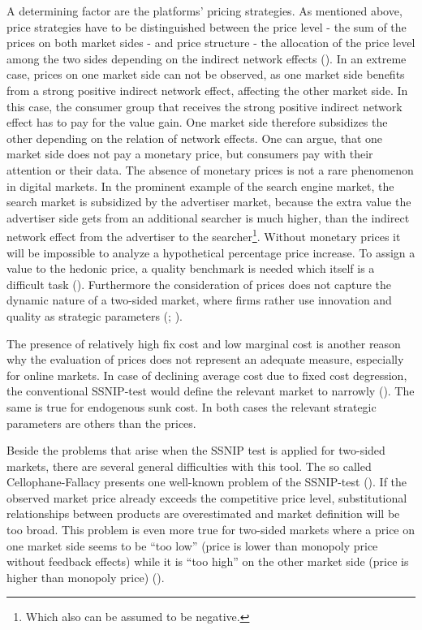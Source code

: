 \documentclass[12pt,a4paper]{scrreprt}
\begin{document}
A determining factor are the platforms' pricing strategies. As mentioned above, price strategies have to be distinguished between the price level - the sum of the prices on both market sides - and price structure - the allocation of the price level among the two sides depending on the indirect network effects (\cite{rochet_two-sided_2006}). In an extreme case, prices on one market side can not be observed, as one market side benefits from a strong positive indirect network effect, affecting the other market side. In this case, the consumer group that receives the strong positive indirect network effect has to pay for the value gain. One market side therefore subsidizes the other depending on the relation of network effects. One can argue, that one market side does not pay a monetary price, but consumers pay with their attention or their data. The absence of monetary prices is not a rare phenomenon in digital markets. In the prominent example of the search engine market, the search market is subsidized by the advertiser market, because the extra value the advertiser side gets from an additional searcher is much higher, than the indirect network effect from the advertiser to the searcher\footnote{Which also can be assumed to be negative.}. Without monetary prices it will be impossible to analyze a hypothetical percentage price increase. To assign a value to the hedonic price, a quality benchmark is needed which itself is a difficult task (\cite{filistrucchi_market_2013}). Furthermore the consideration of prices does not capture the dynamic nature of a two-sided market, where firms rather use innovation and quality as strategic parameters (\cite{evans_economic_2002}; \cite{gual_market_2003}). 

The presence of relatively high fix cost and low marginal cost is another reason why the evaluation of prices does not represent an adequate measure, especially for online markets. In case of declining average cost due to fixed cost degression, the conventional SSNIP-test would define the relevant market to narrowly (\cite{gual_market_2003}). The same is true for endogenous sunk cost. In both cases  the relevant strategic parameters are others than the prices.

Beside the problems that arise when the SSNIP test is applied for two-sided markets, there are several general difficulties with this tool. The so called Cellophane-Fallacy  presents one well-known problem of the SSNIP-test (\cite{schaerr_cellophane_1985}). If the observed market price already exceeds the competitive price level, substitutional relationships between products are overestimated and market definition will be too broad. This problem is even more true for two-sided markets where a price on one market side seems to be “too low” (price is lower than monopoly price without feedback effects) while it is “too high” on the other market side (price is higher than monopoly price) (\cite{dewenter_einfuehrung_2014}).
\end{document}
